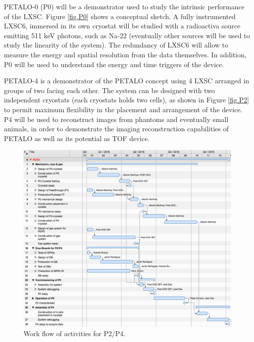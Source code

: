PETALO-0 (P0) will be a demonstrator used to study the intrinsic performance of the LXSC. Figure \ref{fig.P0} shows a conceptual sketch. A fully instrumented LXSC6, immersed in its own cryostat will be studied with a radioactiva source emitting 511 keV photons, such as Na-22 (eventually other sources will be used to study the linearity of the system). The redundancy of LXSC6 will allow to measure the energy and spatial resolution from the data themselves. In addition, P0 will be used to understand the energy and time triggers of the device. 

PETALO-4 is a demonstrator of the PETALO concept using 4 LXSC arranged in groups of two facing each other. The system can be designed with two independent cryostats (each cryostats holds two cells), as shown in Figure \ref{fig.P2} to permit maximum flexibility in the placement and arrangement of the device. P4 will be used to reconstruct images from phantoms and eventually small animals, in order to demonstrate the imaging reconstruction capabilities of PETALO as well as its potential as TOF device. 


\begin{figure}[!htb]
	\centering
	\includegraphics[scale=0.5]{img/P4WF.png}
	\caption{\label{fig.P2WF} Work flow of activities for P2/P4.  }
\end{figure}


